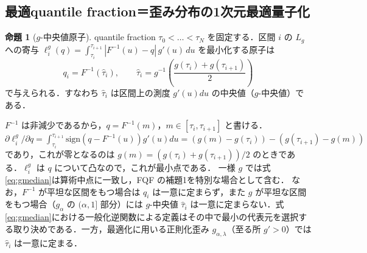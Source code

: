\documentclass[a4paper,10pt]{jsarticle}
\makeatletter
\theoremstyle{definition}
\newtheorem{proposition}{命題}[section]
\renewenvironment{proof}[1][\proofname]{\par
  \pushQED{\qed}%
  \normalfont \topsep6\p@\@plus6\p@\relax
  \trivlist
  \item[\hskip\labelsep\textbf{#1}]\ignorespaces
}{%
  \popQED\endtrivlist\@endpefalse
}
\renewcommand{\proofname}{証明}
\newcommand{\Finv}{F^{-1}}
\makeatother
\begin{document}
\subsection{最適quantile fraction＝歪み分布の1次元最適量子化}
\begin{proposition}[$g$-中央値原子]
\label{prop:gmedian}
quantile fraction $\tau_0<\dots<\tau_N$ を固定する．区間 $i$ の $L_g$ への寄与
$\ell^g_i(q)=\int_{\tau_i}^{\tau_{i+1}}|\Finv(u)-q|\,g'(u)\,du$ を最小化する原子は
\begin{equation}
  q_i=\Finv(\hat\tau_i),\qquad \hat\tau_i=g^{-1}\!\left(\frac{g(\tau_i)+g(\tau_{i+1})}{2}\right)
  \label{eq:gmedian}
\end{equation}
で与えられる．すなわち $\hat\tau_i$ は区間上の測度 $g'(u)du$ の中央値（$g$-中央値）である．
\end{proposition}
\begin{proof}
$\Finv$ は非減少であるから，$q=\Finv(m)$，$m\in[\tau_i,\tau_{i+1}]$ と書ける．
$\partial\ell_i^g/\partial q=\int_{\tau_i}^{\tau_{i+1}}\mathrm{sign}(q-\Finv(u))g'(u)du
=\left(g(m)-g(\tau_i)\right)-\left(g(\tau_{i+1})-g(m)\right)$ であり，これが零となるのは
$g(m)=(g(\tau_i)+g(\tau_{i+1}))/2$ のときである．$\ell^g_i$ は $q$ について凸なので，これが最小点である．
\end{proof}
一様 $g$ では式\eqref{eq:gmedian}は算術中点に一致し，FQF の補題1を特別な場合として含む．
なお，$\Finv$ が平坦な区間をもつ場合は $q_i$ は一意に定まらず，また $g$ が平坦な区間をもつ場合（$g_\alpha$ の $(\alpha,1]$ 部分）には $g$-中央値 $\hat\tau_i$ は一意に定まらない．式\eqref{eq:gmedian}における一般化逆関数による定義はその中で最小の代表元を選択する取り決めである．一方，最適化に用いる正則化歪み $g_{\alpha,\lambda}$（至る所 $g'>0$）では $\hat\tau_i$ は一意に定まる．
\end{document}

